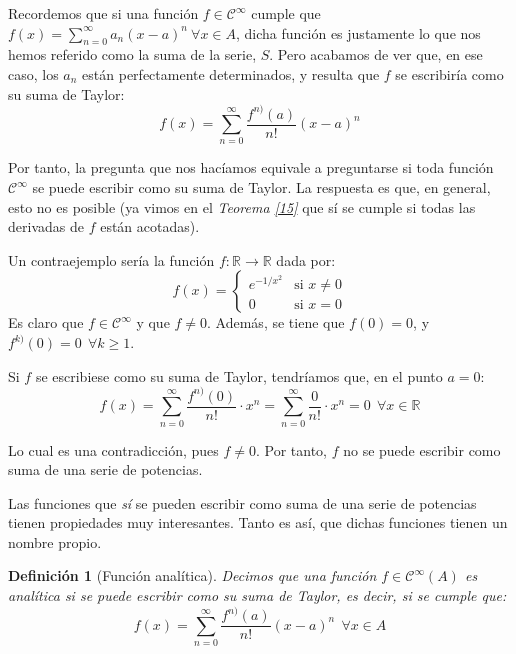 \documentclass[11pt, a4paper]{article}
\theoremstyle{theorem-style}
\theoremstyle{definition-style}
\newtheorem{ndef}{Definición}[section]
\theoremstyle{remark-style}
\theoremstyle{example-style}
\begin{document}
Recordemos que si una función $f \in \mathcal{C}^{\infty}$ cumple que $f(x) = \sum_{n=0}^{\infty} a_n(x-a)^n\ \forall x \in A$, dicha función es justamente lo que nos hemos referido como la suma de la serie, $S$. Pero acabamos de ver que, en ese caso, los $a_n$ están perfectamente determinados, y resulta que $f$ se escribiría como su suma de Taylor: $$f(x) = \sum_{n=0}^{\infty} \frac{f^{n)}(a)}{n!} (x-a)^n$$

Por tanto, la pregunta que nos hacíamos equivale a preguntarse si toda función $\mathcal{C}^{\infty}$ se puede escribir como su suma de Taylor. La respuesta es que, en general, esto no es posible (ya vimos en el \textit{Teorema \ref{15}} que sí se cumple si todas las derivadas de $f$ están acotadas).

Un contraejemplo sería la función $f: \mathbb{R} \longrightarrow \mathbb{R}$ dada por: $$f(x) = \begin{cases}
	         e^{-1/x^2} & \text{si } x\ne 0\\
	         0 & \text{si } x=0
\end{cases}$$ Es claro que $f \in \mathcal{C}^{\infty}$ y que $f \ne 0$. Además, se tiene que $f(0) = 0$, y $f^{k)}(0) = 0\ \ \forall k \ge 1$. 

Si $f$ se escribiese como su suma de Taylor, tendríamos que, en el punto $a=0$: $$f(x) = \sum_{n=0}^{\infty} \frac{f^{n)}(0)}{n!} \cdot x^n =  \sum_{n=0}^{\infty} \frac{0}{n!}\cdot x^n = 0\ \ \forall x \in \mathbb{R}$$

Lo cual es una contradicción, pues $f\ne 0$. Por tanto, $f$ no se puede escribir como suma de una serie de potencias.

Las funciones que \textit{sí} se pueden escribir como suma de una serie de potencias tienen propiedades muy interesantes. Tanto es así, que dichas funciones tienen un nombre propio.

\begin{ndef}[Función analítica] Decimos que una función $f \in \mathcal{C}^{\infty}(A)$ es analítica si se puede escribir como su suma de Taylor, es decir, si se cumple que: $$f(x) = \sum_{n=0}^{\infty} \frac{f^{n)}(a)}{n!}(x-a)^n\ \ \forall x \in A$$
\end{ndef}

\newpage


\end{document}
